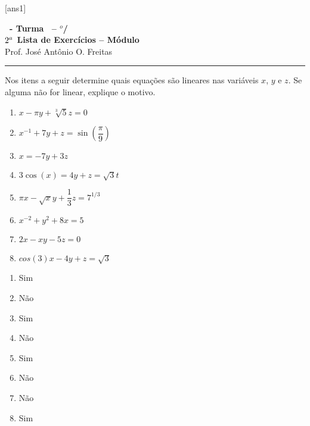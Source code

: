 \documentclass[12pt]{exam}
\begin{document}
  [ans1]
  \begin{center}
    {\Large\bf \disciplina\ - Turma \turma\ -- \semestre$^{o}$/\ano} \\ \vspace{9pt} {\large\bf
        $2^a$ Lista de Exercícios -- Módulo \numeromodulo}\\ \vspace{9pt} Prof. José Antônio O. Freitas
  \end{center}
  \hrule


\begin{exercicio}
  Nos itens a seguir determine quais equações são lineares nas variáveis $x$, $y$ e $z$. Se alguma não for linear, explique o motivo.
  \begin{multicols}{2}
  \begin{enumerate}[label={\alph*})]
    \item $x - \pi y + \sqrt[3]{5}z = 0$
    \item $x^{-1} + 7y + z = \sin(\dfrac{\pi}{9})$
    \item $x = -7y + 3z$
    \item $3\cos(x) = 4y + z = \sqrt{3}t$
    \item $\pi x - \sqrt{x}y + \dfrac{1}{3}z = 7^{1/3}$
    \item $x^{-2} + y^2 + 8x = 5$
    \item $2x - xy - 5z = 0$
    \item $cos(3)x - 4y + z = \sqrt{3}$
  \end{enumerate}
\end{multicols}
  \begin{solucao}
    \begin{enumerate}[label={\alph*})]
      \item Sim
      \item Não
      \item Sim
      \item Não
      \item Sim
      \item Não
      \item Não
      \item Sim
    \end{enumerate}
  \end{solucao}
\end{exercicio}
\end{document}
